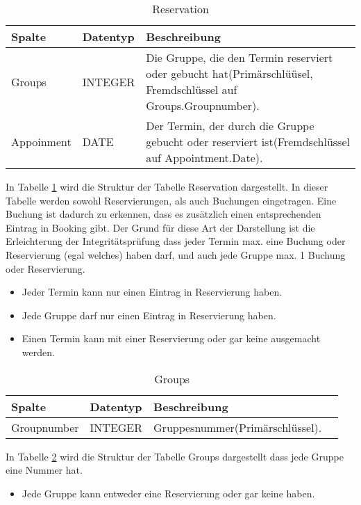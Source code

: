 \documentclass[10pt,a4paper]{article}
\begin{document}
\begin{table}[h]
\centering
	\caption{Reservation}
	\label{tab:Reservation}
    \begin{tabular}{| l | l | l |}
    \hline
    \rowcolor{lightgray} Spalte & Datentyp & Beschreibung  \\ \hline
    Groups & INTEGER & Die Gruppe, die den Termin reserviert oder gebucht hat(Primärschlüüsel, Fremdschlüssel auf Groups.Groupnumber).  \\ \hline
    Appoinment & DATE & Der Termin, der durch die Gruppe gebucht oder reserviert ist(Fremdschlüssel auf Appointment.Date). \\ \hline
    \end{tabular}
\end{table}
In Tabelle \ref{tab:Reservation} wird die Struktur der Tabelle Reservation  dargestellt.  In dieser Tabelle werden sowohl Reservierungen, als auch Buchungen eingetragen. Eine Buchung ist dadurch zu erkennen, dass es zusätzlich einen entsprechenden Eintrag in Booking gibt. Der Grund für diese Art der Darstellung ist die Erleichterung der Integritätsprüfung dass jeder Termin max. eine Buchung oder Reservierung (egal welches) haben darf, und auch jede Gruppe max. 1 Buchung oder Reservierung.

\begin{itemize} 
\item Jeder Termin kann nur einen Eintrag in Reservierung haben.
\item Jede Gruppe darf nur einen Eintrag in Reservierung haben.
\item Einen Termin kann mit einer Reservierung oder gar keine ausgemacht werden.
\end{itemize}
\begin{table}[h]
\centering
\caption{Groups}
    \label{tab:Groups}    
    \begin{tabular}{| l | l | l | l |}
    \hline
    \rowcolor{lightgray} Spalte & Datentyp & Beschreibung  \\ \hline
    Groupnumber & INTEGER & Gruppesnummer(Primärschlüssel).  \\ \hline
   \end{tabular}
\end{table}

In Tabelle \ref{tab:Groups} wird die Struktur der Tabelle Groups dargestellt dass jede Gruppe eine Nummer hat.

\begin{itemize}
\item Jede Gruppe kann entweder eine Reservierung oder gar keine haben. 

\end{itemize}
\end{document}
